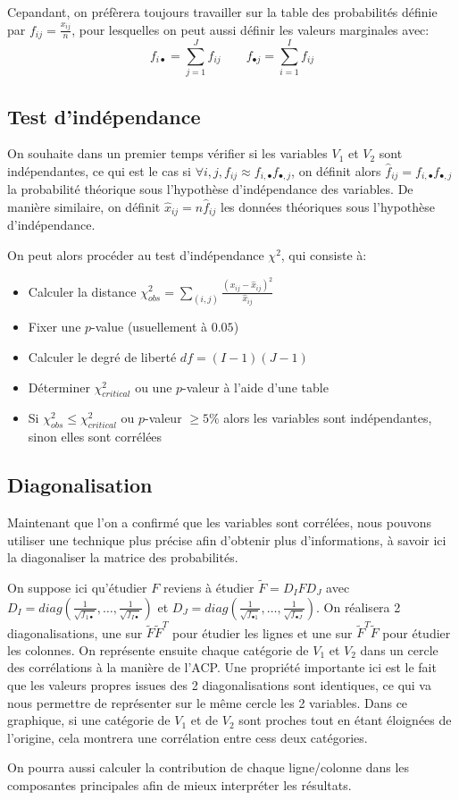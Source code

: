 Cepandant, on préfèrera toujours travailler sur la table des probabilités définie par $f_{ij} = \frac{x_{ij}}{n}$, pour lesquelles on peut aussi définir les valeurs marginales avec: 
\begin{equation}
  f_{i\bullet} = \sum_{j=1}^J f_{ij} \qquad
  f_{\bullet j} = \sum_{i=1}^I f_{ij}
\end{equation}

\subsection{Test d'indépendance}

On souhaite dans un premier temps vérifier si les variables $V_1$ et $V_2$ sont indépendantes, ce qui est le cas si $\forall i, j, f_{ij} \approx f_{i,\bullet}f_{\bullet, j}$, on définit alors $\hat{f}_{ij} = f_{i,\bullet}f_{\bullet, j}$ la probabilité théorique sous l'hypothèse d'indépendance des variables. 
De manière similaire, on définit $\hat{x}_{ij} = n\hat{f}_{ij}$ les données théoriques sous l'hypothèse d'indépendance. 

On peut alors procéder au test d'indépendance $\chi^2$, qui consiste à:
\begin{itemize}
  \item Calculer la distance $\chi_{obs}^2 = \sum_{(i,j)} \frac{(x_{ij} - \hat{x}_{ij})^2}{\hat{x}_{ij}}$ 
  \item Fixer une $p$-value (usuellement à $0.05$)
  \item Calculer le degré de liberté $df = (I - 1)(J - 1)$ 
  \item Déterminer $\chi_{critical}^2$ ou une $p$-valeur à l'aide d'une table 
  \item Si $\chi_{obs}^2 \leq \chi_{critical}^2$ ou $p$-valeur $\geq 5\%$ alors les variables sont indépendantes, sinon elles sont corrélées
\end{itemize}

\subsection{Diagonalisation}

Maintenant que l'on a confirmé que les variables sont corrélées, nous pouvons utiliser une technique plus précise afin d'obtenir plus d'informations, à savoir ici la diagonaliser la matrice des probabilités.

On suppose ici qu'étudier $F$ reviens à étudier $\tilde{F} = D_IFD_J$ avec $D_I = diag(\frac{1}{\sqrt{f_{1 \bullet}}}, \dots, \frac{1}{\sqrt{f_{I\bullet}}})$ et $D_J = diag(\frac{1}{\sqrt{f_{\bullet 1}}}, \dots, \frac{1}{\sqrt{f_{\bullet J}}})$.
On réalisera 2 diagonalisations, une sur $\tilde{F}\tilde{F}^T$ pour étudier les lignes et une sur $\tilde{F}^T\tilde{F}$ pour étudier les colonnes.
On représente ensuite chaque catégorie de $V_1$ et $V_2$ dans un cercle des corrélations à la manière de l'ACP.
Une propriété importante ici est le fait que les valeurs propres issues des 2 diagonalisations sont identiques, ce qui va nous permettre de représenter sur le même cercle les 2 variables. Dans ce graphique, si une catégorie de $V_1$ et de $V_2$ sont proches tout en étant éloignées de l'origine, cela montrera une corrélation entre cess deux catégories.

On pourra aussi calculer la contribution de chaque ligne/colonne dans les composantes principales afin de mieux interpréter les résultats.
